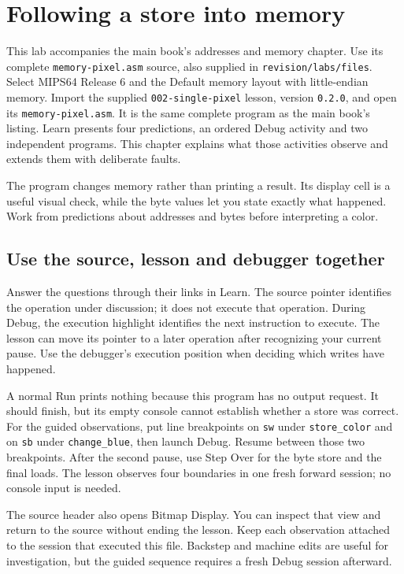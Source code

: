 \chapter{Following a store into memory}
\label{revision:lab-addresses-and-memory}

This lab accompanies the main book's addresses and memory chapter. Use its
complete \texttt{memory-pixel.asm} source, also supplied in
\texttt{revision/labs/files}. Select MIPS64 Release 6 and the Default memory
layout with little-endian memory. Import the supplied \texttt{002-single-pixel}
lesson, version \texttt{0.2.0}, and open its \texttt{memory-pixel.asm}. It is the
same complete program as the main book's listing. Learn presents four predictions,
an ordered Debug activity and two independent programs. This chapter explains
what those activities observe and extends them with deliberate faults.

The program changes memory rather than printing a result. Its display cell is a
useful visual check, while the byte values let you state exactly what happened.
Work from predictions about addresses and bytes before interpreting a color.

\section{Use the source, lesson and debugger together}

Answer the questions through their links in Learn. The source pointer identifies
the operation under discussion; it does not execute that operation. During Debug,
the execution highlight identifies the next instruction to execute. The lesson
can move its pointer to a later operation after recognizing your current pause.
Use the debugger's execution position when deciding which writes have happened.

A normal Run prints nothing because this program has no output request. It should
finish, but its empty console cannot establish whether a store was correct.
For the guided observations, put line breakpoints on \texttt{sw} under
\texttt{store\_color} and on \texttt{sb} under \texttt{change\_blue}, then launch
Debug. Resume between those two breakpoints. After the second pause, use Step Over
for the byte store and the final loads. The lesson observes four boundaries in
one fresh forward session; no console input is needed.

The source header also opens Bitmap Display. You can inspect that view and return
to the source without ending the lesson. Keep each observation attached to the
session that executed this file. Backstep and machine edits are useful for
investigation, but the guided sequence requires a fresh Debug session afterward.

